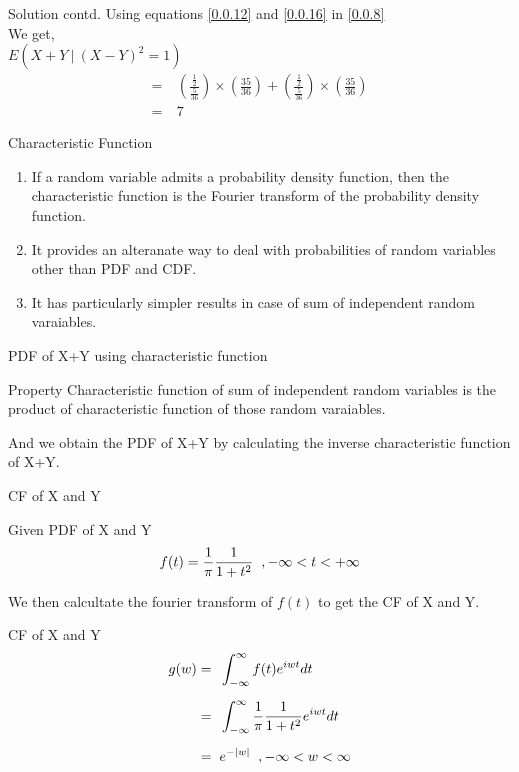 \documentclass{beamer}
\providecommand{\brak}[1]{\ensuremath{\left(#1\right)}}
\providecommand{\abs}[1]{\vert#1\vert}
\begin{document}
\begin{frame}{Solution contd.}
    Using equations \eqref{0.0.12} and \eqref{0.0.16} in \eqref{0.0.8}\\
    We get,\\
    \newline
    $E\brak{X+Y\:|\:(X-Y)^2=1}$
    \begin{align}
        =&\:\brak{\frac{\frac{1}{2}}{\frac{5}{36}}}\times\brak{\frac{35}{36}}+\brak{\frac{\frac{1}{2}}{\frac{5}{36}}}\times\brak{\frac{35}{36}}\\
        =&\:7
    \end{align}
\end{frame}

\begin{frame}{Characteristic Function}
  \begin{enumerate}
    \item If a random variable admits a probability density function, then the characteristic function
          is the Fourier transform of the probability density function.
    \item    It provides an alteranate way to deal with probabilities of random variables
          other than PDF and CDF.
    \item It has particularly simpler results in case of sum of independent random varaiables.
  \end{enumerate}
\end{frame}
\begin{frame}{PDF of X+Y using characteristic function}
  \begin{block}{Property}
    Characteristic function of sum of independent random variables is the product of characteristic function of those random varaiables.
  \end{block}
  And we obtain the PDF of X+Y by calculating the inverse characteristic function of X+Y.
\end{frame}
\begin{frame}{CF of X and Y}
  \begin{block}{Given PDF of X and Y}
    \begin{align}
      f(t) = \displaystyle\frac{1}{\pi} \frac{1}{1+{t}^2} \hspace{0.2cm},-\infty < t < +\infty\label{0.0.1}
    \end{align}
  \end{block}
  We then calcultate the fourier transform of $f(t)$ to get the CF of X and Y.
  \begin{block}{CF of X and Y}
    \begin{align}
      g(w) =\hspace{0.2cm} & \int_{-\infty}^{\infty}  f(t) {e}^{iwt} dt                                         \\[0.2cm]
      =\hspace{0.2cm}      & \int_{-\infty}^{\infty}  \displaystyle\frac{1}{\pi} \frac{1}{1+{t}^2} {e}^{iwt} dt \\[0.2cm]
      =\hspace{0.2cm}      & e^{-\abs{w}}\hspace{0.2cm}, -\infty<w<\infty
    \end{align}
  \end{block}
\end{frame}
\end{document}
